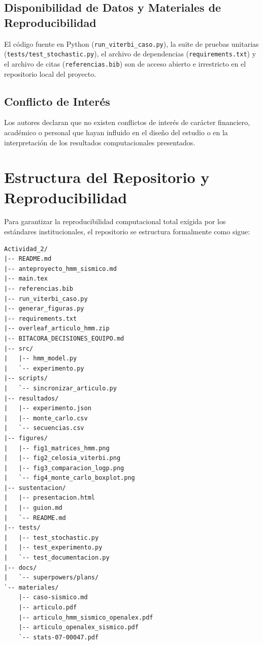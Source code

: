\documentclass[11pt,a4paper]{article}
\begin{document}
\subsection*{Disponibilidad de Datos y Materiales de Reproducibilidad}
El código fuente en Python (\texttt{run\_viterbi\_caso.py}), la suite de pruebas unitarias (\texttt{tests/test\_stochastic.py}), el archivo de dependencias (\texttt{requirements.txt}) y el archivo de citas (\texttt{referencias.bib}) son de acceso abierto e irrestricto en el repositorio local del proyecto.

\subsection*{Conflicto de Interés}
Los autores declaran que no existen conflictos de interés de carácter financiero, académico o personal que hayan influido en el diseño del estudio o en la interpretación de los resultados computacionales presentados.




\appendix
\section{Estructura del Repositorio y Reproducibilidad}

Para garantizar la reproducibilidad computacional total exigida por los estándares institucionales, el repositorio se estructura formalmente como sigue:

\begin{lstlisting}[style=pythonstyle, numbers=none]
Actividad_2/
|-- README.md
|-- anteproyecto_hmm_sismico.md
|-- main.tex
|-- referencias.bib
|-- run_viterbi_caso.py
|-- generar_figuras.py
|-- requirements.txt
|-- overleaf_articulo_hmm.zip
|-- BITACORA_DECISIONES_EQUIPO.md
|-- src/
|   |-- hmm_model.py
|   `-- experimento.py
|-- scripts/
|   `-- sincronizar_articulo.py
|-- resultados/
|   |-- experimento.json
|   |-- monte_carlo.csv
|   `-- secuencias.csv
|-- figures/
|   |-- fig1_matrices_hmm.png
|   |-- fig2_celosia_viterbi.png
|   |-- fig3_comparacion_logp.png
|   `-- fig4_monte_carlo_boxplot.png
|-- sustentacion/
|   |-- presentacion.html
|   |-- guion.md
|   `-- README.md
|-- tests/
|   |-- test_stochastic.py
|   |-- test_experimento.py
|   `-- test_documentacion.py
|-- docs/
|   `-- superpowers/plans/
`-- materiales/
    |-- caso-sismico.md
    |-- articulo.pdf
    |-- articulo_hmm_sismico_openalex.pdf
    |-- articulo_openalex_sismico.pdf
    `-- stats-07-00047.pdf
\end{lstlisting}
\end{document}
